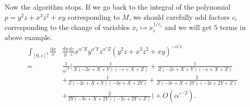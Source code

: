 \documentclass[12pt]{article}
\theoremstyle{definition}
\theoremstyle{plain}
\newcommand{\dif}{\mathrm{d}} %
\begin{document}
Now the algorithm stops. If we go back to the integral of the polynomial $p=y^2z+x^3z^2+xy$
corresponding to $M$, we should carefully add factors $c_i$
corresponding to the change of variables $x_i\mapsto x_i^{1/c_i}$ and we will get $5$ terms 
in above example.
\begin{align*}
	\int_{[0,\epsilon]^3}\frac{\dif x}{x}&\frac{\dif y}{y}\frac{\dif z}{z}
	x^{\alpha' X}y^{\alpha' Y}z^{\alpha' Z}(y^2z+x^3z^2+xy)^{-\alpha' c}\\
	=\,&\frac{1}{{\alpha'}^3}\biggl(
	\frac{1}{X (-2 c+X+Y) (-c+X+Z)}+\frac{1}{Z (-2 c+X+Y) (-c+X+Z)}\\
	&+\frac{1}{Z (-2 c+X+Y) (-3 c+X+2 Y)}+
	\frac{2}{Z (-3 c+X+2 Y) (-2 c+2 Y+Z)}\\
	&+\frac{2}{2 Y (-3 c+X+2 Y) (-2 c+2 Y+Z)}
	\biggr) +O({\alpha'}^{-2}).
\end{align*}


\end{document}
